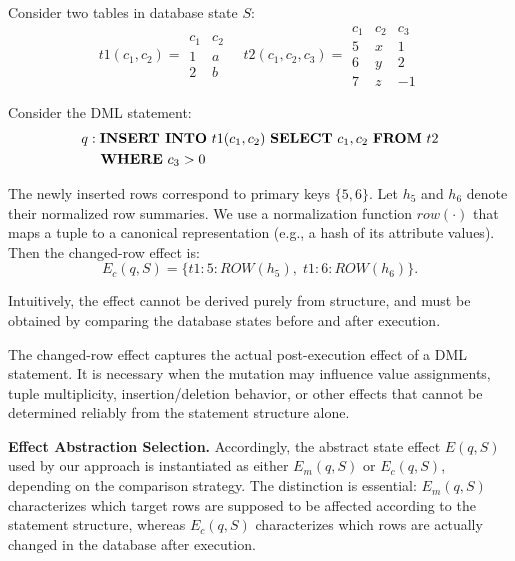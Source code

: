 \begin{example}
	Consider two tables in database state $S$:
	\[
	t1(c_1, c_2) =
	\begin{array}{c|c}
		c_1 & c_2 \\
		\hline
		1 & a \\
		2 & b
	\end{array}
	\quad
	t2(c_1, c_2, c_3) =
	\begin{array}{c|c|c}
		c_1 & c_2 & c_3 \\
		\hline
		5 & x & 1 \\
		6 & y & 2 \\
		7 & z & -1
	\end{array}
	\]
	
	Consider the DML statement:
	\[
	\begin{aligned}
	q : &\; \text{\textbf{INSERT INTO} } t1(c_1, c_2)
	\text{ \textbf{SELECT} } c_1, c_2
	\text{ \textbf{FROM} } t2 \\
	&\text{ \textbf{WHERE} } c_3 > 0
	\end{aligned}
	\]
	
	The newly inserted rows correspond to primary keys $\{5,6\}$.  
	Let $h_5$ and $h_6$ denote their normalized row summaries.  
	We use a normalization function $\mathit{row}(\cdot)$ that maps a tuple to a canonical representation (e.g., a hash of its attribute values).
	Then the changed-row effect is:
	\[
	E_c(q,S)=\{t1\!:\!5\!:\!\mathit{ROW}(h_5),\; t1\!:\!6\!:\!\mathit{ROW}(h_6)\}.
	\]
	
	Intuitively, the effect cannot be derived purely from structure, and must be obtained by comparing the database states before and after execution.
\end{example}
The changed-row effect captures the actual post-execution effect of a DML statement. It is necessary when the mutation may influence value assignments, tuple multiplicity, insertion/deletion behavior, or other effects that cannot be determined reliably from the statement structure alone.

\textbf{Effect Abstraction Selection.}
Accordingly, the abstract state effect $E(q,S)$ used by our approach is instantiated as either $E_m(q,S)$ or $E_c(q,S)$, depending on the comparison strategy. 
The distinction is essential: $E_m(q,S)$ characterizes which target rows are supposed to be affected according to the statement structure, whereas $E_c(q,S)$ characterizes which rows are actually changed in the database after execution.


